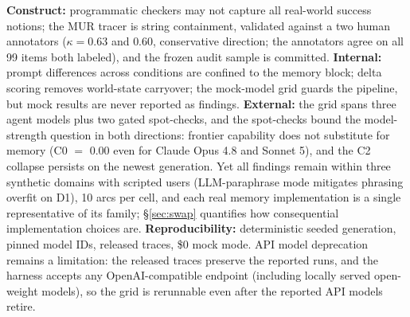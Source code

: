 \documentclass[11pt]{article}
\begin{document}
\textbf{Construct:} programmatic checkers may not capture all real-world
success notions; the MUR tracer is string containment, validated against a
two human annotators ($\kappa = 0.63$ and $0.60$, conservative direction;
the annotators agree on all 99 items both labeled), and the frozen audit
sample is committed. \textbf{Internal:} prompt
differences across conditions are confined to the memory block; delta
scoring removes world-state carryover; the mock-model grid guards the
pipeline, but mock results are never reported as findings.
\textbf{External:} the grid spans three agent models plus two gated
spot-checks, and the spot-checks bound the model-strength question in both
directions: frontier capability does not substitute for memory (C0
$=$ 0.00 even for Claude Opus 4.8 and Sonnet 5), and the C2 collapse
persists on the newest generation. Yet all findings remain within three
synthetic domains with scripted users (LLM-paraphrase mode mitigates
phrasing overfit on D1), 10 arcs per cell, and each real memory
implementation is a single representative of its family;
\S\ref{sec:swap} quantifies how consequential implementation choices are. \textbf{Reproducibility:} deterministic seeded generation,
pinned model IDs, released traces, \$0 mock mode. API model deprecation
remains a limitation: the released traces preserve the reported runs, and
the harness accepts any OpenAI-compatible endpoint (including locally
served open-weight models), so the grid is rerunnable even after the
reported API models retire.
\end{document}
